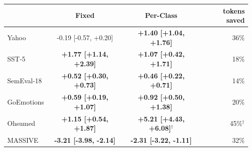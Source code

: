 \begin{tabular}{lccr}
\toprule
 & Fixed & Per-Class & tokens saved \\
\midrule
Yahoo & -0.19 [-0.57, +0.20] & \textbf{+1.40 [+1.04, +1.76]} & 36\% \\
SST-5 & \textbf{+1.77 [+1.14, +2.39]} & \textbf{+1.07 [+0.42, +1.71]} & 18\% \\
SemEval-18 & \textbf{+0.52 [+0.30, +0.73]} & \textbf{+0.46 [+0.22, +0.71]} & 14\% \\
GoEmotions & \textbf{+0.59 [+0.19, +1.07]} & \textbf{+0.92 [+0.50, +1.38]} & 20\% \\
Ohsumed & \textbf{+1.15 [+0.54, +1.87]} & \textbf{+5.21 [+4.43, +6.08]}$^{\dagger}$ & 45\%$^{\dagger}$ \\
MASSIVE & \textbf{-3.21 [-3.98, -2.14]} & \textbf{-2.31 [-3.22, -1.11]} & 32\% \\
\bottomrule
\end{tabular}

